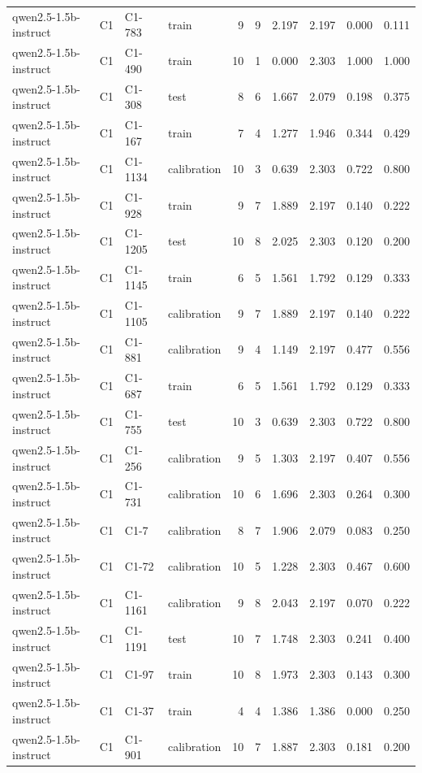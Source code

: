\begin{table}
\begin{tabular}{llllrrrrrr}
qwen2.5-1.5b-instruct & C1 & C1-783 & train & 9 & 9 & 2.197 & 2.197 & 0.000 & 0.111 \\
qwen2.5-1.5b-instruct & C1 & C1-490 & train & 10 & 1 & 0.000 & 2.303 & 1.000 & 1.000 \\
qwen2.5-1.5b-instruct & C1 & C1-308 & test & 8 & 6 & 1.667 & 2.079 & 0.198 & 0.375 \\
qwen2.5-1.5b-instruct & C1 & C1-167 & train & 7 & 4 & 1.277 & 1.946 & 0.344 & 0.429 \\
qwen2.5-1.5b-instruct & C1 & C1-1134 & calibration & 10 & 3 & 0.639 & 2.303 & 0.722 & 0.800 \\
qwen2.5-1.5b-instruct & C1 & C1-928 & train & 9 & 7 & 1.889 & 2.197 & 0.140 & 0.222 \\
qwen2.5-1.5b-instruct & C1 & C1-1205 & test & 10 & 8 & 2.025 & 2.303 & 0.120 & 0.200 \\
qwen2.5-1.5b-instruct & C1 & C1-1145 & train & 6 & 5 & 1.561 & 1.792 & 0.129 & 0.333 \\
qwen2.5-1.5b-instruct & C1 & C1-1105 & calibration & 9 & 7 & 1.889 & 2.197 & 0.140 & 0.222 \\
qwen2.5-1.5b-instruct & C1 & C1-881 & calibration & 9 & 4 & 1.149 & 2.197 & 0.477 & 0.556 \\
qwen2.5-1.5b-instruct & C1 & C1-687 & train & 6 & 5 & 1.561 & 1.792 & 0.129 & 0.333 \\
qwen2.5-1.5b-instruct & C1 & C1-755 & test & 10 & 3 & 0.639 & 2.303 & 0.722 & 0.800 \\
qwen2.5-1.5b-instruct & C1 & C1-256 & calibration & 9 & 5 & 1.303 & 2.197 & 0.407 & 0.556 \\
qwen2.5-1.5b-instruct & C1 & C1-731 & calibration & 10 & 6 & 1.696 & 2.303 & 0.264 & 0.300 \\
qwen2.5-1.5b-instruct & C1 & C1-7 & calibration & 8 & 7 & 1.906 & 2.079 & 0.083 & 0.250 \\
qwen2.5-1.5b-instruct & C1 & C1-72 & calibration & 10 & 5 & 1.228 & 2.303 & 0.467 & 0.600 \\
qwen2.5-1.5b-instruct & C1 & C1-1161 & calibration & 9 & 8 & 2.043 & 2.197 & 0.070 & 0.222 \\
qwen2.5-1.5b-instruct & C1 & C1-1191 & test & 10 & 7 & 1.748 & 2.303 & 0.241 & 0.400 \\
qwen2.5-1.5b-instruct & C1 & C1-97 & train & 10 & 8 & 1.973 & 2.303 & 0.143 & 0.300 \\
qwen2.5-1.5b-instruct & C1 & C1-37 & train & 4 & 4 & 1.386 & 1.386 & 0.000 & 0.250 \\
qwen2.5-1.5b-instruct & C1 & C1-901 & calibration & 10 & 7 & 1.887 & 2.303 & 0.181 & 0.200 \\

\end{tabular}
\end{table}
